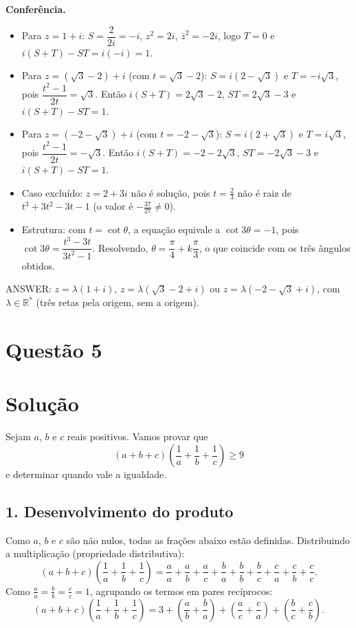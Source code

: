\documentclass{article}%
\begin{document}
\textbf{Conferência.}
\begin{itemize}
\item Para $z=1+i$: $S=\dfrac{2}{2i}=-i$, $z^2=2i$, $\bar z^2=-2i$, logo $T=0$ e $i(S+T)-ST=i(-i)=1$. \checkmark
\item Para $z=(\sqrt{3}-2)+i$ (com $t=\sqrt{3}-2$): $S=i(2-\sqrt{3})$ e $T=-i\sqrt{3}$, pois $\dfrac{t^2-1}{2t}=\sqrt{3}$. Então $i(S+T)=2\sqrt{3}-2$, $ST=2\sqrt{3}-3$ e $i(S+T)-ST=1$. \checkmark
\item Para $z=(-2-\sqrt{3})+i$ (com $t=-2-\sqrt{3}$): $S=i(2+\sqrt{3})$ e $T=i\sqrt{3}$, pois $\dfrac{t^2-1}{2t}=-\sqrt{3}$. Então $i(S+T)=-2-2\sqrt{3}$, $ST=-2\sqrt{3}-3$ e $i(S+T)-ST=1$. \checkmark
\item Caso excluído: $z=2+3i$ não é solução, pois $t=\frac{2}{3}$ não é raiz de $t^3+3t^2-3t-1$ (o valor é $-\frac{37}{27}\neq 0$).
\item Estrutura: com $t=\cot\theta$, a equação equivale a $\cot 3\theta=-1$, pois $\cot 3\theta=\dfrac{t^3-3t}{3t^2-1}$. Resolvendo, $\theta=\dfrac{\pi}{4}+k\dfrac{\pi}{3}$, o que coincide com os três ângulos obtidos.
\end{itemize}

ANSWER: $z=\lambda(1+i)$, $z=\lambda(\sqrt{3}-2+i)$ ou $z=\lambda(-2-\sqrt{3}+i)$, com $\lambda\in\mathbb{R}^*$ (três retas pela origem, sem a origem).%
\newpage%
\section*{Questão 5}

\section*{Solução}

Sejam $a$, $b$ e $c$ reais positivos. Vamos provar que
\[
(a+b+c)\left(\frac{1}{a}+\frac{1}{b}+\frac{1}{c}\right)\geq 9
\]
e determinar quando vale a igualdade.

\subsection*{1. Desenvolvimento do produto}

Como $a$, $b$ e $c$ são não nulos, todas as frações abaixo estão definidas. Distribuindo a multiplicação (propriedade distributiva):
\[
(a+b+c)\left(\frac{1}{a}+\frac{1}{b}+\frac{1}{c}\right)
=\frac{a}{a}+\frac{a}{b}+\frac{a}{c}+\frac{b}{a}+\frac{b}{b}+\frac{b}{c}+\frac{c}{a}+\frac{c}{b}+\frac{c}{c}.
\]
Como $\frac{a}{a}=\frac{b}{b}=\frac{c}{c}=1$, agrupando os termos em pares recíprocos:
\[
(a+b+c)\left(\frac{1}{a}+\frac{1}{b}+\frac{1}{c}\right)
=3+\left(\frac{a}{b}+\frac{b}{a}\right)+\left(\frac{a}{c}+\frac{c}{a}\right)+\left(\frac{b}{c}+\frac{c}{b}\right).
\]
\end{document}
